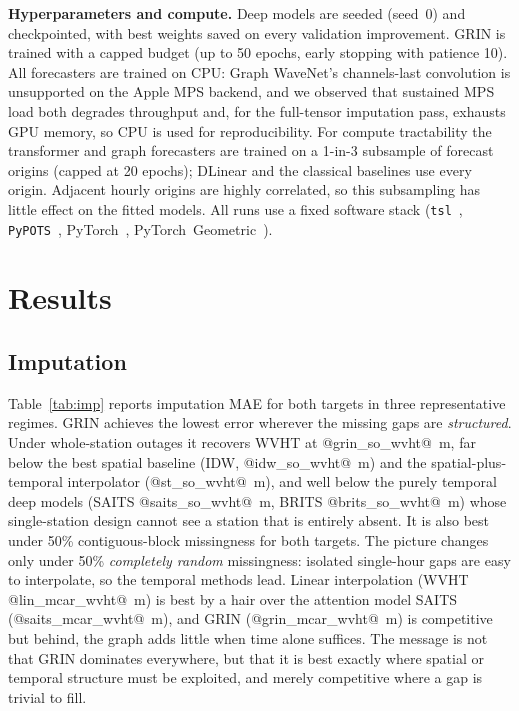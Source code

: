 \documentclass[11pt]{article}
\begin{document}
\noindent\textbf{Hyperparameters and compute.} Deep models are seeded
(seed~0) and checkpointed, with best weights saved on every validation improvement.
GRIN is trained with a capped budget (up to 50 epochs, early stopping with patience
10). All forecasters are trained on CPU: Graph WaveNet's channels-last convolution
is unsupported on the Apple MPS backend, and we observed that sustained MPS load
both degrades throughput and, for the full-tensor imputation pass, exhausts GPU
memory, so CPU is used for reproducibility. For compute tractability the transformer
and graph forecasters are trained on a 1-in-3 subsample of forecast origins (capped
at 20 epochs); DLinear and the classical baselines use every origin. Adjacent hourly
origins are highly correlated, so this subsampling has little effect on the fitted
models. All runs use a fixed software stack (\texttt{tsl}~\citep{tsl},
\texttt{PyPOTS}~\citep{pypots}, PyTorch~\citep{pytorch}, PyTorch~Geometric~\citep{pyg}).

\section{Results}
\label{sec:results}

\subsection{Imputation}
Table~\ref{tab:imp} reports imputation MAE for both targets in three
representative regimes. GRIN achieves the lowest error wherever the missing gaps
are \emph{structured}. Under whole-station outages it recovers WVHT at
@grin_so_wvht@~m, far below the best spatial baseline (IDW, @idw_so_wvht@~m) and
the spatial-plus-temporal interpolator (@st_so_wvht@~m), and well below the
purely temporal deep models (SAITS @saits_so_wvht@~m, BRITS @brits_so_wvht@~m)
whose single-station design cannot see a station that is entirely absent. It is
also best under 50\% contiguous-block missingness for both targets. The picture
changes only under 50\% \emph{completely random} missingness: isolated single-hour
gaps are easy to interpolate, so the temporal methods lead. Linear interpolation
(WVHT @lin_mcar_wvht@~m) is best by a hair over the attention model SAITS
(@saits_mcar_wvht@~m), and GRIN (@grin_mcar_wvht@~m) is competitive but behind, the
graph adds little when time alone suffices. The message is not that GRIN dominates
everywhere, but that it is best exactly where spatial or temporal structure must be
exploited, and merely competitive where a gap is trivial to fill.
\end{document}
